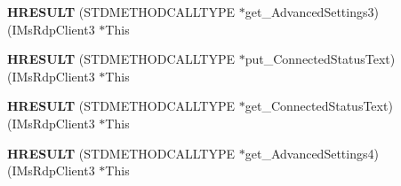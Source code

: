 \begin{DoxyCompactItemize}
\mbox{\label{struct_i_ms_rdp_client3_vtbl_a358d2b997d4ec69e8cbbc7741b56af2f}} 
{\bfseries H\+R\+E\+S\+U\+LT} (S\+T\+D\+M\+E\+T\+H\+O\+D\+C\+A\+L\+L\+T\+Y\+PE $\ast$get\+\_\+\+Advanced\+Settings3)(I\+Ms\+Rdp\+Client3 $\ast$This
\item 
\mbox{\label{struct_i_ms_rdp_client3_vtbl_a6ab8a34ad0197d246ea8e552001e0f35}} 
{\bfseries H\+R\+E\+S\+U\+LT} (S\+T\+D\+M\+E\+T\+H\+O\+D\+C\+A\+L\+L\+T\+Y\+PE $\ast$put\+\_\+\+Connected\+Status\+Text)(I\+Ms\+Rdp\+Client3 $\ast$This
\item 
\mbox{\label{struct_i_ms_rdp_client3_vtbl_a7757d54de6bc48c044c74e3d46f14c88}} 
{\bfseries H\+R\+E\+S\+U\+LT} (S\+T\+D\+M\+E\+T\+H\+O\+D\+C\+A\+L\+L\+T\+Y\+PE $\ast$get\+\_\+\+Connected\+Status\+Text)(I\+Ms\+Rdp\+Client3 $\ast$This
\item 
\mbox{\label{struct_i_ms_rdp_client3_vtbl_ad5d95cc06a18cefa204be7029cbff52e}} 
{\bfseries H\+R\+E\+S\+U\+LT} (S\+T\+D\+M\+E\+T\+H\+O\+D\+C\+A\+L\+L\+T\+Y\+PE $\ast$get\+\_\+\+Advanced\+Settings4)(I\+Ms\+Rdp\+Client3 $\ast$This
\end{DoxyCompactItemize}
